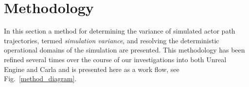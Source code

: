 \documentclass[letterpaper, 10 pt, journal, twoside]{IEEEtran}
\begin{document}



\section{Methodology} \label{s:methodology}
In this section a method for determining the variance of simulated actor path trajectories, termed \textit{simulation variance}, and resolving the deterministic operational domains of the simulation are presented. 
%
This methodology has been refined several times over the course of our investigations into both Unreal Engine and Carla and is presented here as a work flow, see Fig.~\ref{method_diagram}. %
%
\end{document}
